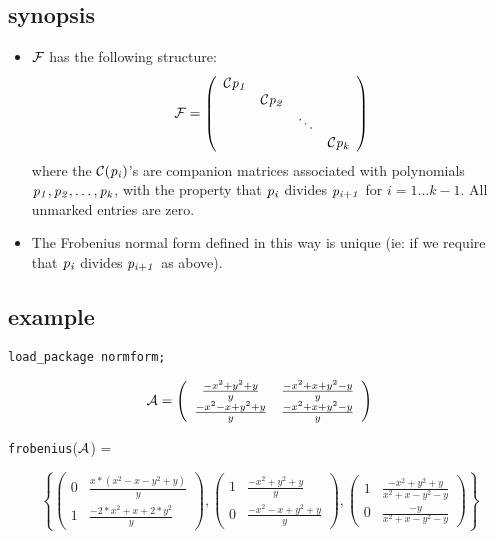\subsection{synopsis}

\begin{itemize}
\item ${\cal F}$ has the following structure:
      \begin{displaymath}
      {\cal F} = \left( \begin{array}{cccc} {\cal C}{\it p_{1}} &  &  &
      \\  & {\cal C}{\it p_{2}} &  &  \\  &  & \ddots &  \\  &  &  &
      {\cal C}{\it p_{k}} \end{array} \right)
      \end{displaymath}
      where the ${\cal C}({\it p_{i}})$'s are companion matrices
      associated with polynomials ${\it p_{1}, p_{2}},\ldots,
      {\it p_{k}}$, with the property that ${\it p_{i}}$ divides
      ${\it p_{i+1}}$ for $i =1\ldots k-1$. All unmarked entries are
      zero.

\item The Frobenius normal form defined in this way is unique (ie: if
      we require that ${\it p_{i}}$ divides ${\it p_{i+1}}$ as above).
\end{itemize}

\subsection{example}

{\tt load\_package normform;}

\begin{displaymath}
{\cal A} = \left( \begin{array}{cc} \frac{-x^2+y^2+y}{y} &
\frac{-x^2+x+y^2-y}{y} \\ \frac{-x^2-x+y^2+y}{y} & \frac{-x^2+x+y^2-y}
{y} \end{array} \right)
\end{displaymath}

{\tt frobenius}(${\cal A}$) =
\begin{center}
\begin{displaymath}
\left\{ \left( \begin{array}{cc} 0 & \frac{x*(x^2-x-y^2+y)}{y} \\ 1 &
\frac{-2*x^2+x+2*y^2}{y} \end{array} \right), \left( \begin{array}{cc}
1 & \frac{-x^2+y^2+y}{y} \\ 0 & \frac{-x^2-x+y^2+y}{y} \end{array}
\right), \left( \begin{array}{cc} 1 & \frac{-x^2+y^2+y}{x^2+x-y^2-y} \\
0 & \frac{-y}{x^2+x-y^2-y} \end{array} \right) \right\}
\end{displaymath}
\end{center}


